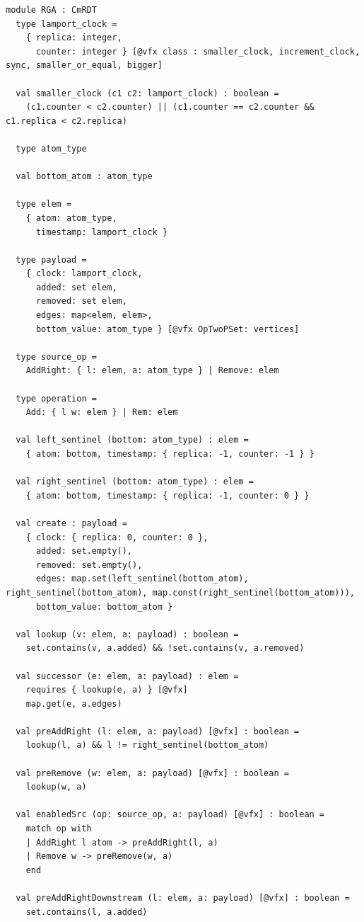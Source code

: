 \begin{lstlisting}[caption={\texttt{RGA}}, label={lst:app_rga}]
module RGA : CmRDT
  type lamport_clock =
    { replica: integer,
      counter: integer } [@vfx class : smaller_clock, increment_clock, sync, smaller_or_equal, bigger]

  val smaller_clock (c1 c2: lamport_clock) : boolean =
    (c1.counter < c2.counter) || (c1.counter == c2.counter && c1.replica < c2.replica)

  type atom_type

  val bottom_atom : atom_type

  type elem =
    { atom: atom_type,
      timestamp: lamport_clock }

  type payload =
    { clock: lamport_clock,
      added: set elem,
      removed: set elem,
      edges: map<elem, elem>,
      bottom_value: atom_type } [@vfx OpTwoPSet: vertices]

  type source_op =
    AddRight: { l: elem, a: atom_type } | Remove: elem

  type operation =
    Add: { l w: elem } | Rem: elem

  val left_sentinel (bottom: atom_type) : elem =
    { atom: bottom, timestamp: { replica: -1, counter: -1 } }

  val right_sentinel (bottom: atom_type) : elem =
    { atom: bottom, timestamp: { replica: -1, counter: 0 } }

  val create : payload =
    { clock: { replica: 0, counter: 0 },
      added: set.empty(),
      removed: set.empty(),
      edges: map.set(left_sentinel(bottom_atom), right_sentinel(bottom_atom), map.const(right_sentinel(bottom_atom))),
      bottom_value: bottom_atom }

  val lookup (v: elem, a: payload) : boolean =
    set.contains(v, a.added) && !set.contains(v, a.removed)

  val successor (e: elem, a: payload) : elem =
    requires { lookup(e, a) } [@vfx]
    map.get(e, a.edges)

  val preAddRight (l: elem, a: payload) [@vfx] : boolean =
    lookup(l, a) && l != right_sentinel(bottom_atom)

  val preRemove (w: elem, a: payload) [@vfx] : boolean =
    lookup(w, a)

  val enabledSrc (op: source_op, a: payload) [@vfx] : boolean =
    match op with
    | AddRight l atom -> preAddRight(l, a)
    | Remove w -> preRemove(w, a)
    end

  val preAddRightDownstream (l: elem, a: payload) [@vfx] : boolean =
    set.contains(l, a.added)


\end{lstlisting}
